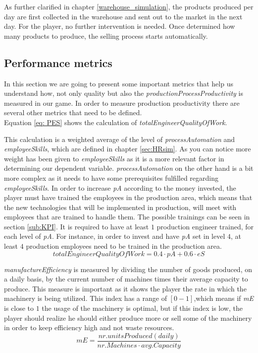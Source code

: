 As further clarified in chapter \ref{warehouse_simulation}, the products produced per day are first collected in the warehouse and sent out to the market in the next day. For the player, no further intervention is needed. Once determined how many products to produce, the selling process starts automatically.

\subsection{Performance metrics}
\label{sub:PM}

In this section we are going to present some important metrics that help us understand how, not only quality but also the \textit{productionProcessProductivity} is measured in our game. In order to measure production productivity there are several other metrics that need to be defined. \\
Equation \ref{eq: PES} shows the calculation of \textit{totalEngineerQualityOfWork}.

This calculation is a weighted average of the level of \textit{processAutomation} and \textit{employeeSkills}, which are defined in chapter \ref{sec:HRsim}. As you can notice more weight has been given to \textit{employeeSkills} as it is a more relevant factor in determining our dependent variable. \textit{processAutomation} on the other hand is a bit more complex as it needs to have some prerequisites fulfilled regarding \textit{employeeSkills}. In order to increase \textit{pA} according to the money invested, the player must have trained the employees in the production area, which means that the new technologies that will be implemented in production, will meet with employees that are trained to handle them. The possible trainings can be seen in section \ref{sub:KPI}. It is required to have at least $1$ production engineer trained, for each level of \textit{pA}. For instance, in order to invest and have \textit{pA} set in level $4$, at least $4$ production employees need to be trained in the production area.
\begin{equation}
totalEngineerQualityOfWork = 0.4\cdot pA + 0.6\cdot eS
\label{eq: PES}
\end{equation}

\textit{manufactureEfficiency} is measured by dividing the number of goods produced, on a daily basis, by the current number of machines times their average capacity to produce. This measure is important as it shows the player the rate in which the machinery is being utilized. This index has a range of $[0-1]$,which means if \textit{mE} is close to $1$ the usage of the machinery is optimal, but if this index is low, the player should realize he should either produce more or sell some of the machinery in order to keep efficiency high and not waste resources.
\begin{equation}
mE= \frac{nr. units Produced(daily)}{nr. Machines\cdot avg. Capacity}  
\label{eq: ME}
\end{equation}

